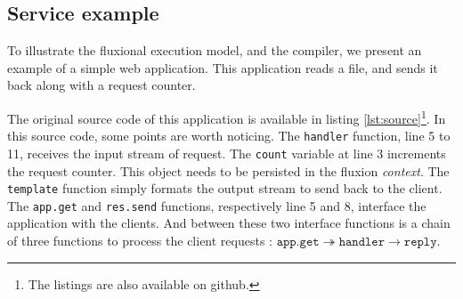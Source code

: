 


\subsection{Service example}

To illustrate the fluxional execution model, and the compiler, we present an example of a simple web application.
This application reads a file, and sends it back along with a request counter.

The original source code of this application is available in listing \ref{lst:source}\footnote{The listings are also available on github\cite{flx-example}.}.
In this source code, some points are worth noticing.
The \texttt{handler} function, line 5 to 11, receives the input stream of request.
The \texttt{count} variable at line 3 increments the request counter.
This object needs to be persisted in the fluxion \textit{context}.
The \texttt{template} function simply formats the output stream to send back to the client.
The \texttt{app.get} and \texttt{res.send} functions, respectively line 5 and 8, interface the application with the clients.
And between these two interface functions is a chain of three functions to process the client requests : $\texttt{app.get} \twoheadrightarrow \texttt{handler} \to \texttt{reply}$.

